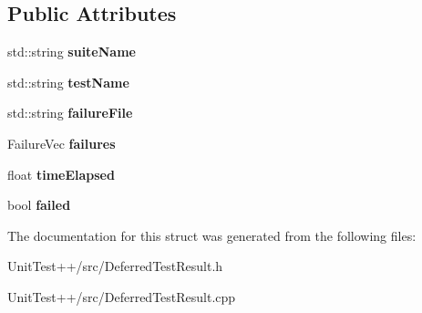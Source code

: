 \subsection*{Public Attributes}
\begin{DoxyCompactItemize}
\item 
\hypertarget{structUnitTest_1_1DeferredTestResult_ad9c83c05fb8c2d81753ed5e765db0bc3}{std\-::string {\bfseries suite\-Name}}\label{structUnitTest_1_1DeferredTestResult_ad9c83c05fb8c2d81753ed5e765db0bc3}

\item 
\hypertarget{structUnitTest_1_1DeferredTestResult_a2e491a75905c60c3c3b1022060a5a1f0}{std\-::string {\bfseries test\-Name}}\label{structUnitTest_1_1DeferredTestResult_a2e491a75905c60c3c3b1022060a5a1f0}

\item 
\hypertarget{structUnitTest_1_1DeferredTestResult_a191bbff9b19585cee1b87f7e56311da9}{std\-::string {\bfseries failure\-File}}\label{structUnitTest_1_1DeferredTestResult_a191bbff9b19585cee1b87f7e56311da9}

\item 
\hypertarget{structUnitTest_1_1DeferredTestResult_a39042498a0a8bbba2817cf97978b8c91}{Failure\-Vec {\bfseries failures}}\label{structUnitTest_1_1DeferredTestResult_a39042498a0a8bbba2817cf97978b8c91}

\item 
\hypertarget{structUnitTest_1_1DeferredTestResult_a09cb77930cd0ee30c05118bfebb27f51}{float {\bfseries time\-Elapsed}}\label{structUnitTest_1_1DeferredTestResult_a09cb77930cd0ee30c05118bfebb27f51}

\item 
\hypertarget{structUnitTest_1_1DeferredTestResult_a29d12313c586cc950f8a36e0b742124f}{bool {\bfseries failed}}\label{structUnitTest_1_1DeferredTestResult_a29d12313c586cc950f8a36e0b742124f}

\end{DoxyCompactItemize}


The documentation for this struct was generated from the following files\-:\begin{DoxyCompactItemize}
\item 
Unit\-Test++/src/Deferred\-Test\-Result.\-h\item 
Unit\-Test++/src/Deferred\-Test\-Result.\-cpp\end{DoxyCompactItemize}
